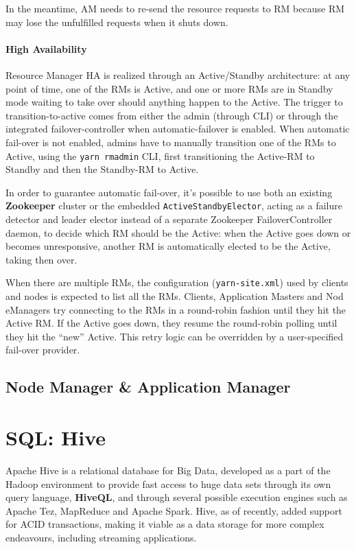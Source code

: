 In the meantime, AM needs to re-send the resource requests to RM because RM may lose the unfulfilled requests when it shuts down.

\paragraph{High Availability} Resource Manager HA is realized through an Active/Standby architecture: at any point of time, one of the RMs is Active, and one or more RMs are in Standby mode waiting to take over should anything happen to the Active. The trigger to transition-to-active comes from either the admin (through CLI) or through the integrated failover-controller when automatic-failover is enabled. When automatic fail-over is not enabled, admins have to manually transition one of the RMs to Active, using the \verb|yarn rmadmin| CLI, first transitioning the Active-RM to Standby and then the Standby-RM to Active.

In order to guarantee automatic fail-over, it's possible to use both an existing \textbf{Zookeeper} cluster or the embedded \verb|ActiveStandbyElector|, acting as a failure detector and leader elector instead of a separate Zookeeper FailoverController daemon, to decide which RM should be the Active: when the Active goes down or becomes unresponsive, another RM is automatically elected to be the Active, taking then over.

When there are multiple RMs, the configuration (\verb|yarn-site.xml|) used by clients and nodes is expected to list all the RMs. Clients, Application Masters and Nod eManagers try connecting to the RMs in a round-robin fashion until they hit the Active RM. If the Active goes down, they resume the round-robin polling until they hit the “new” Active. This retry logic can be overridden by a user-specified fail-over provider.

\subsection{Node Manager \& Application Manager}

\pagebreak
\section{SQL: Hive}

Apache Hive is a relational database for Big Data, developed as a part of the Hadoop environment to provide fast access to huge data sets through its own query language, \textbf{HiveQL}, and through several possible execution engines such as Apache Tez, MapReduce and Apache Spark. Hive, as of recently, added  support for ACID transactions, making it viable as a data storage for more complex endeavours, including streaming applications.

